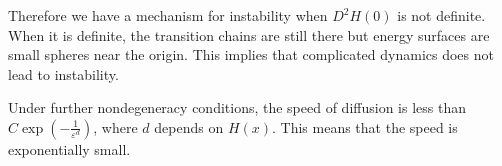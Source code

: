 
Therefore we have a mechanism for instability when $D^{2}H(0)$ is not definite. When it is definite, the transition chains are still there but energy surfaces are small spheres near the origin. This implies that complicated dynamics does not lead to instability.

\begin{theorem}
	Under further nondegeneracy conditions, the speed of diffusion is less than $C\exp \left(- \frac{1}{\varepsilon^{d}}\right)$, where $d$ depends on $H(x)$. This means that the speed is exponentially small.
\end{theorem}

